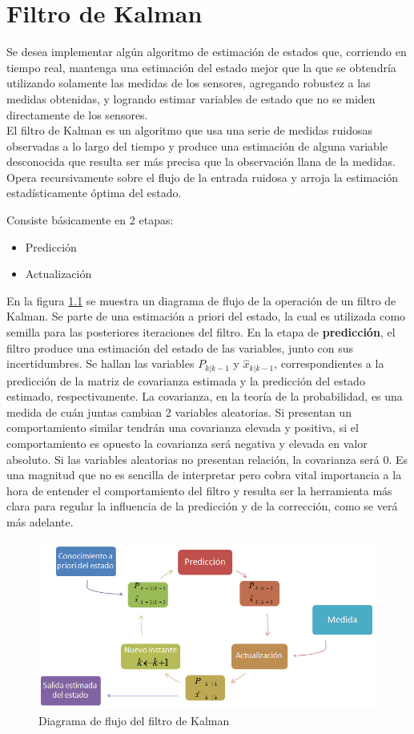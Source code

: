 \documentclass[main]{subfiles}
\begin{document}
\chapter{Filtro de Kalman}

Se desea implementar algún algoritmo de estimación de estados que, corriendo en tiempo real, mantenga una estimación del estado mejor que la que se obtendría utilizando solamente las medidas de los sensores, agregando robustez a las medidas obtenidas, y logrando estimar variables de estado que no se miden directamente de los sensores.\\

El filtro de Kalman es un algoritmo que usa una serie de medidas ruidosas observadas a lo largo del tiempo y produce una estimación de alguna variable desconocida que resulta ser más precisa que la observación llana de la medidas. Opera recursivamente sobre el flujo de la entrada ruidosa y arroja la estimación estadísticamente óptima del estado.

Consiste básicamente en 2 etapas:
\begin{itemize}
  \item Predicción
  \item Actualización
\end{itemize}

En la figura \ref{fig:kal} se muestra un diagrama de flujo de la operación de un filtro de Kalman. Se parte de una estimación a priori del estado, la cual es utilizada como semilla para las posteriores iteraciones del filtro. En la etapa de \textbf{predicción}, el filtro produce una estimación del estado de las variables, junto con sus incertidumbres. Se hallan las variables $P_{k|k-1}$ y $\hat{x}_{k|k-1}$, correspondientes a la predicción de la matriz de covarianza estimada y la predicción del estado estimado, respectivamente. La covarianza, en la teoría de la probabilidad, es una medida de cuán juntas cambian 2 variables aleatorias. Si presentan un comportamiento similar tendrán una covarianza elevada y positiva, si el comportamiento es opuesto la covarianza será negativa y elevada en valor absoluto. Si las variables aleatorias no presentan relación, la covarianza será 0. Es una magnitud que no es sencilla de interpretar pero cobra vital importancia a la hora de entender el comportamiento del filtro y resulta ser la herramienta más clara para regular la influencia de la predicción y de la corrección, como se verá más adelante.\\

\begin{figure}[h!]
	\centering
	\includegraphics[width=.8\textwidth]{./pics_kalman/kal.png}
	\caption{Diagrama de flujo del filtro de Kalman}
	\label{fig:kal}
\end{figure}
\end{document}
